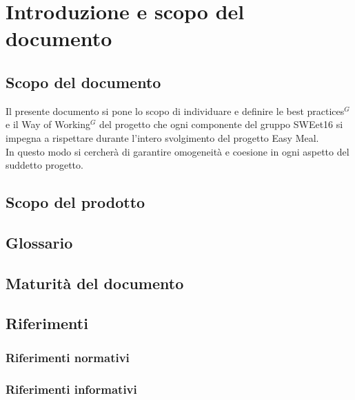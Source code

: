\section{Introduzione e scopo del documento}

    \subsection{Scopo del documento}

    Il presente documento si pone lo scopo di individuare e definire le best practices$^{G}$ e il Way of Working$^{G}$ del progetto che ogni componente del gruppo SWEet16
    si impegna a rispettare durante l’intero svolgimento del progetto Easy Meal. \\
    In questo modo si cercherà di garantire omogeneità e coesione in ogni aspetto del suddetto progetto.
  
    \subsection{Scopo del prodotto}

    \subsection{Glossario}

    \subsection{Maturità del documento}

    \subsection{Riferimenti}

        \subsubsection{Riferimenti normativi}

        \subsubsection{Riferimenti informativi}
